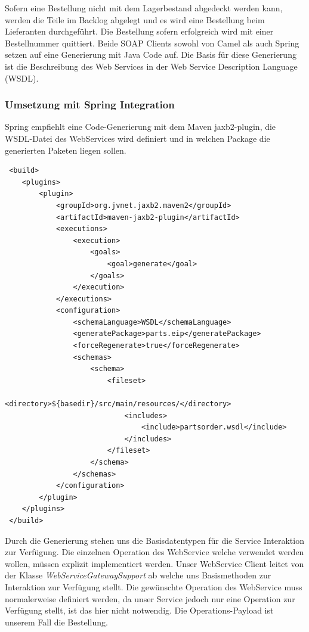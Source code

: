 \documentclass[12pt,a4paper,ngerman]{article}
\begin{document}
Sofern eine Bestellung nicht mit dem Lagerbestand abgedeckt werden kann,
werden die Teile im Backlog abgelegt und es wird eine Bestellung beim
Lieferanten durchgeführt. Die Bestellung sofern erfolgreich wird mit
einer Bestellnummer quittiert. Beide SOAP Clients sowohl von Camel als
auch Spring setzen auf eine Generierung mit Java Code auf. Die Basis für
diese Generierung ist die Beschreibung des Web Services in der Web
Service Description Language (WSDL).

\subsubsection{Umsetzung mit Spring Integration}

Spring empfiehlt eine Code-Generierung mit dem Maven jaxb2-plugin, die
WSDL-Datei des WebServices wird definiert und in welchen Package die
generierten Paketen liegen sollen.

\begin{lstlisting}
 <build>
    <plugins>
        <plugin>
            <groupId>org.jvnet.jaxb2.maven2</groupId>
            <artifactId>maven-jaxb2-plugin</artifactId>
            <executions>
                <execution>
                    <goals>
                        <goal>generate</goal>
                    </goals>
                </execution>
            </executions>
            <configuration>
                <schemaLanguage>WSDL</schemaLanguage>
                <generatePackage>parts.eip</generatePackage>
                <forceRegenerate>true</forceRegenerate>
                <schemas>
                    <schema>
                        <fileset>
                            <directory>${basedir}/src/main/resources/</directory>
                            <includes>
                                <include>partsorder.wsdl</include>
                            </includes>
                        </fileset>
                    </schema>
                </schemas>
            </configuration>
        </plugin>
    </plugins>
 </build>
\end{lstlisting}

Durch die Generierung stehen uns die Basisdatentypen für die Service
Interaktion zur Verfügung. Die einzelnen Operation des WebService welche
verwendet werden wollen, müssen explizit implementiert werden. Unser
WebService Client leitet von der Klasse \emph{WebServiceGatewaySupport}
ab welche uns Basismethoden zur Interaktion zur Verfügung stellt. Die
gewünschte Operation des WebService muss normalerweise definiert werden,
da unser Service jedoch nur eine Operation zur Verfügung stellt, ist das
hier nicht notwendig. Die Operations-Payload ist unserem Fall die
Bestellung.
\end{document}

